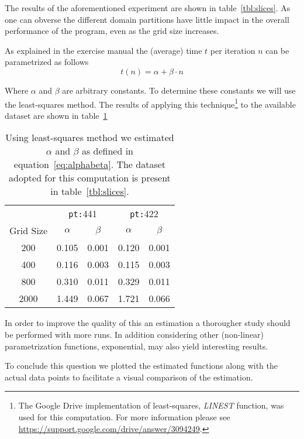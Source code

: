 The results of the aforementioned experiment are shown in table~\ref{tbl:slices}. As one can obverse the different domain partitions have little impact in the overall performance of the program, even as the grid size increases.


As explained in the exercise manual the (average) time $t$ per iteration $n$ can be parametrized as follows
\begin{equation}
t(n) = \alpha + \beta \cdot n
\label{eq:alphabeta}
\end{equation}

Where $\alpha$ and $\beta$ are arbitrary constants. To determine these constants we will use the least-squares method. The results of applying this technique\footnote{The Google Drive implementation of least-squares, \emph{LINEST} function, was used for this computation. For more information please see \url{https://support.google.com/drive/answer/3094249}.} to the available dataset are shown in table~\ref{tbl:alphabeta}

\begin{table}[H]
\centering
\begin{tabular}{*{5}{c}}
 \toprule
            &    \multicolumn{2}{c}{\texttt{pt:}441} & \multicolumn{2}{c}{\texttt{pt:}422} \\
Grid Size   &    $\alpha$ &    $\beta$                & $\alpha$    & $\beta$ \\ \midrule
200         &    0.105    &    0.001                  & 0.120       & 0.001   \\
400         &    0.116    &    0.003                  & 0.115       & 0.003   \\
800         &    0.310    &    0.011                  & 0.329       & 0.011   \\
2000        &    1.449    &    0.067                  & 1.721       & 0.066   \\
\bottomrule
\end{tabular}
\caption{Using least-squares method we estimated $\alpha$ and $\beta$ as defined in equation~\ref{eq:alphabeta}. The dataset adopted for this computation is present in table~\ref{tbl:slices}.}
\label{tbl:alphabeta}
\end{table}

In order to improve the quality of this an estimation a thorougher study should be performed with more runs. In addition considering other (non-linear) parametrization functions, \eg exponential, may also yield interesting results.

To conclude this question we plotted the estimated functions along with the actual data points to facilitate a visual comparison of the estimation.


